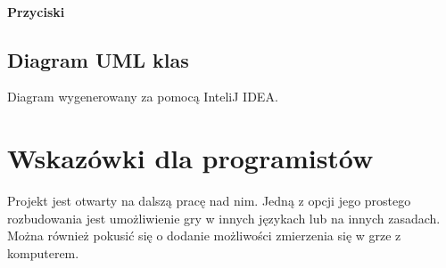 \documentclass[a4paper]{article}
\begin{document}
\paragraph{Przyciski}
\begin{enumerate}
\item[] \texttt{CellButton}} wyświetla pojedyncze pole na planszy gry.
\end{enumerate}
\subsection{Diagram UML klas}
Diagram wygenerowany za pomocą InteliJ IDEA.
\section{Wskazówki dla programistów}
Projekt jest otwarty na dalszą pracę nad nim. Jedną z opcji jego prostego rozbudowania jest umożliwienie gry w innych językach lub na innych zasadach. Można również pokusić się o dodanie możliwości zmierzenia się w grze z komputerem.
\end{document}
